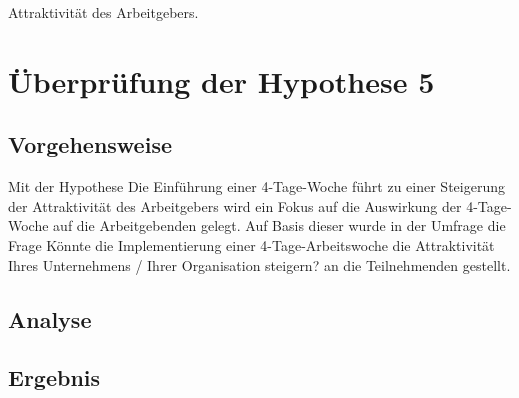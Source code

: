 Attraktivität des Arbeitgebers. 

\chapter{Überprüfung der Hypothese 5}
\label{chap:hypothese5}


\section{Vorgehensweise}
Mit der Hypothese \glqq{}Die Einführung einer 4-Tage-Woche führt zu einer 
Steigerung der Attraktivität des Arbeitgebers\grqq{} wird ein Fokus auf die 
Auswirkung der 4-Tage-Woche auf die Arbeitgebenden gelegt. Auf Basis dieser wurde in der Umfrage
die Frage \glqq{}Könnte die Implementierung einer 4-Tage-Arbeitswoche die Attraktivität Ihres 
Unternehmens / Ihrer Organisation steigern?\grqq{} an die Teilnehmenden gestellt.

\section{Analyse}

\section{Ergebnis}